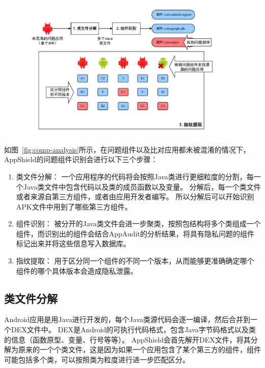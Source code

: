 \begin{figure}
	\centering
	\includegraphics[width=0.9\textwidth]{figure/comp-analysis.pdf}
\end{figure}


如图~\ref{fig:comp-analysis}所示，在问题组件以及比对应用都未被混淆的情况下，AppShield的问题组件识别会进行以下三个步骤：

\begin{enumerate}
	\item 类文件分解：
		一个应用程序的代码将会按照Java类进行更细粒度的分割，每一个Java类文件中包含代码以及类的成员函数以及变量。
		分解后，每一个类文件或者来源自第三方组件，或者由应用开发者编写。
		所以分解后可以开始识别APK文件中用到了哪些第三方组件。
	\item 组件识别：
		被分开的Java类文件会进一步聚类，按照包结构将多个类组成一个组件，而识别出的组件会结合AppAudit的分析结果，将具有隐私问题的组件标记出来并将这些信息写入数据库。
	\item 指纹提取：
		用于区分同一个组件的不同一个版本，从而能够更准确确定哪个组件的哪个具体版本会造成隐私泄露。
\end{enumerate}

\subsection{类文件分解}
Android应用是用Java进行开发的，每个Java类源代码会逐一编译，然后合并到一个DEX文件中。
DEX是Android的可执行代码格式，包含Java字节码格式以及类的信息（函数原型、变量、行号等等）。
AppShield会首先解开DEX文件，将其分解为原来的一个个类文件，这是因为如果一个应用包含了某个第三方的组件，组件可能包括多个类，可以按照类为粒度进行进一步匹配区分。


